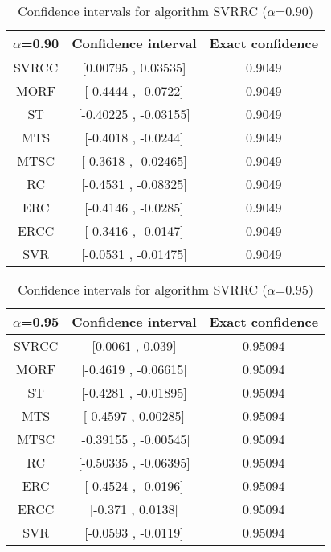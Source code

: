 \documentclass[a4paper,10pt]{article}
\begin{document}
\begin{table}[!htp]
\centering\small
\begin{tabular}{
|c|c|c|}
\hline
 $\alpha$=0.90 & Confidence interval & Exact confidence \\ \hline 
SVRCC & [0.00795 , 0.03535] & 0.9049\\ \hline 
MORF & [-0.4444 , -0.0722] & 0.9049\\ \hline 
ST & [-0.40225 , -0.03155] & 0.9049\\ \hline 
MTS & [-0.4018 , -0.0244] & 0.9049\\ \hline 
MTSC & [-0.3618 , -0.02465] & 0.9049\\ \hline 
RC & [-0.4531 , -0.08325] & 0.9049\\ \hline 
ERC & [-0.4146 , -0.0285] & 0.9049\\ \hline 
ERCC & [-0.3416 , -0.0147] & 0.9049\\ \hline 
SVR & [-0.0531 , -0.01475] & 0.9049\\ \hline 

\end{tabular}
\caption{Confidence intervals for algorithm SVRRC ($\alpha$=0.90)}
\end{table}
\begin{table}[!htp]
\centering\small
\begin{tabular}{
|c|c|c|}
\hline
 $\alpha$=0.95 & Confidence interval & Exact confidence \\ \hline 
SVRCC & [0.0061 , 0.039] & 0.95094\\ \hline 
MORF & [-0.4619 , -0.06615] & 0.95094\\ \hline 
ST & [-0.4281 , -0.01895] & 0.95094\\ \hline 
MTS & [-0.4597 , 0.00285] & 0.95094\\ \hline 
MTSC & [-0.39155 , -0.00545] & 0.95094\\ \hline 
RC & [-0.50335 , -0.06395] & 0.95094\\ \hline 
ERC & [-0.4524 , -0.0196] & 0.95094\\ \hline 
ERCC & [-0.371 , 0.0138] & 0.95094\\ \hline 
SVR & [-0.0593 , -0.0119] & 0.95094\\ \hline 

\end{tabular}
\caption{Confidence intervals for algorithm SVRRC ($\alpha$=0.95)}
\end{table}

 \clearpage 
\end{document}

